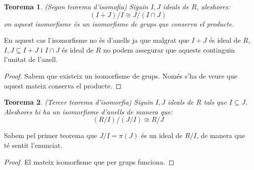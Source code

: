\documentclass[a4paper,11pt]{report}
\theoremstyle{theorem}
\newtheorem{teorema}{\normalfont \sffamily\bfseries Teorema}[section]
\theoremstyle{definition}
\begin{document}
\begin{teorema}(Segon teorema d'isomofia)
	Siguin $I,J$ ideals de $R$, aleshores:$$(I+J)/I\cong J/(I\cap J)$$
	on aquest isomorfisme és un isomorfisme de grups que conserva el producte.
\end{teorema}
En aquest cas l'isomorfisme no és d'anells ja que malgrat que $I+J$ és ideal de $R$, $I,J\subseteq I+J$ i $I\cap J$ és ideal de $R$ no podem assegurar que aquests continguin l'unitat de l'anell.
\begin{proof}
	Sabem que existeix un isomorfisme de grups. Només s'ha de veure que aquest mateix conserva el producte. 
\end{proof}
\begin{teorema}(Tercer teorema d'isomorfia)
	Siguin $I,J$ ideals de $R$ tals que $I\subseteq	J$. Aleshores hi ha un isomorfisme d'anells de manera que:$$(R/I)/(J/I)\cong R/J$$
\end{teorema}
Sabem pel primer teorema que $J/I=\pi(J)$ és un ideal de $R/I$, de manera que té sentit l'enunciat.
\begin{proof}
	El mateix isomorfisme que per grups funciona.
\end{proof}
\end{document}

